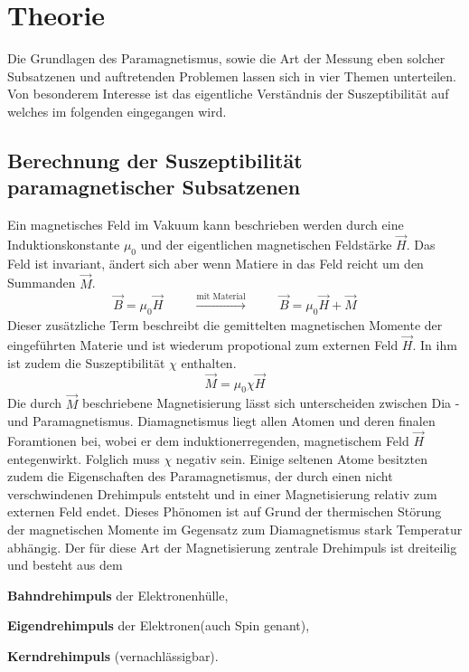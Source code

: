 \section{Theorie}
Die Grundlagen des Paramagnetismus, sowie die Art der Messung eben solcher Subsatzenen und auftretenden Problemen 
lassen sich in vier Themen unterteilen. Von besonderem Interesse ist das eigentliche Verständnis der Suszeptibilität 
auf welches im folgenden eingegangen wird.

\subsection{Berechnung der Suszeptibilität paramagnetischer Subsatzenen}
\label{sadge1}
Ein magnetisches Feld im Vakuum kann beschrieben werden durch eine Induktionskonstante $\mu_0$ und der eigentlichen magnetischen Feldstärke
$\vec{H}$. Das Feld ist invariant, ändert sich aber wenn Matiere in das Feld reicht um den Summanden $\vec{M}$. 
\begin{equation}
    \vec{B}=\mu_0 \vec{H} \hspace{1cm} \xrightarrow[]{\text{mit Material}} \hspace{1cm} \vec{B}=\mu_0 \vec{H} + \vec{M}
\end{equation}
Dieser zusätzliche Term beschreibt die gemittelten magnetischen Momente der eingeführten Materie und ist wiederum propotional zum externen Feld $\vec{H}$. 
In ihm ist zudem die Suszeptibilität $\chi$ enthalten.
\begin{equation}
    \vec{M} = \mu_0 \chi \vec{H}
\end{equation}
Die durch $\vec{M}$ beschriebene Magnetisierung lässt sich unterscheiden zwischen Dia - und Paramagnetismus. 
Diamagnetismus liegt allen Atomen und deren finalen Foramtionen bei, wobei er dem induktionerregenden, magnetischem Feld $\vec{H}$
entegenwirkt. Folglich muss $\chi$ negativ sein.
Einige seltenen Atome besitzten zudem die Eigenschaften des Paramagnetismus, der durch einen nicht verschwindenen Drehimpuls entsteht und in einer 
Magnetisierung relativ zum externen Feld endet.
Dieses Phönomen ist auf Grund der thermischen Störung der magnetischen Momente im Gegensatz zum Diamagnetismus stark Temperatur abhängig.
Der für diese Art der Magnetisierung zentrale Drehimpuls ist dreiteilig und besteht aus dem
\begin{description}
    \item \textbf{Bahndrehimpuls} der Elektronenhülle,\\
    \item \textbf{Eigendrehimpuls} der Elektronen(auch Spin genant), \\
    \item \textbf{Kerndrehimpuls} (vernachlässigbar).
\end{description}
